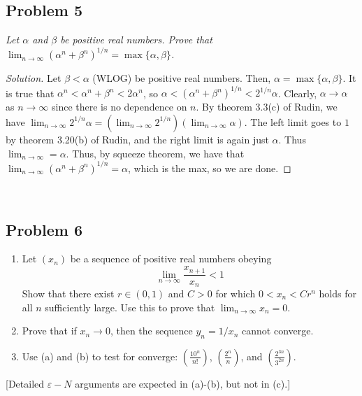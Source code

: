 \documentclass{article}
\newcommand{\ep}{{\varepsilon}}
\begin{document}
\subsection*{Problem 5}
{\it Let $\alpha$ and $\beta$ be positive real numbers.
Prove that $\lim_{n\to\infty}(\alpha^n + \beta^n)^{1/n} = \max\{\alpha,\beta\}$.}

\begin{proof}[Solution]\let\qed\relax
	Let $\beta < \alpha$ (WLOG) be positive real numbers.
	Then, $\alpha = \max\{\alpha,\beta\}$.
	It is true that $\alpha^n < \alpha^n + \beta^n < 2\alpha^n$,
	so $\alpha < (\alpha^n + \beta^n)^{1/n} < 2^{1/n}\alpha$.
	Clearly, $\alpha \to \alpha$ as $n \to \infty$ since there is no dependence on $n$.
	By theorem 3.3(c) of Rudin,
	we have $\lim_{n\to\infty} 2^{1/n}\alpha = (\lim_{n\to\infty} 2^{1/n})(\lim_{n\to\infty} \alpha)$.
	The left limit goes to $1$ by theorem 3.20(b) of Rudin,
	and the right limit is again just $\alpha$.
	Thus $\lim_{n\to\infty} = \alpha$.
	Thus, by squeeze theorem, we have that
	$\lim_{n\to\infty}(\alpha^n+\beta^n)^{1/n} = \alpha$,
	which is the max,
	so we are done.
\end{proof}
\clearpage
~\clearpage

\subsection*{Problem 6}
{\it \begin{enumerate}
	\item Let $(x_n)$ be a sequence of positive real numbers obeying
		\[
			\lim_{n\to\infty} \frac{x_{n+1}}{x_n} < 1
		\]
		Show that there exist $r \in (0,1)$ and $C>0$ for which
		$0<x_n<Cr^n$ holds for all $n$ sufficiently large.
		Use this to prove that $\lim_{n\to\infty}x_n = 0$.
	\item Prove that if $x_n \to 0$, then the sequence $y_n = 1/x_n$ cannot converge.
	\item Use (a) and (b) to test for converge:
		$\left(\frac{10^n}{n!}\right)$, $\left(\frac{2^n}{n}\right)$,
		and $\left(\frac{2^{3n}}{3^{2n}}\right)$.
\end{enumerate}
[Detailed $\ep-N$ arguments are expected in (a)-(b), but not in (c).]}
\end{document}
